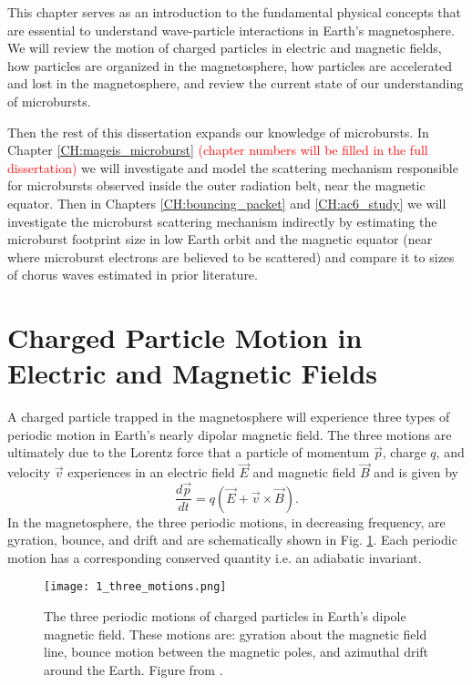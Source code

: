 This chapter serves as an introduction to the fundamental physical concepts that are essential to understand wave-particle interactions in Earth's magnetosphere. We will review the motion of charged particles in electric and magnetic fields, how particles are organized in the magnetosphere, how particles are accelerated and lost in the magnetosphere, and review the current state of our understanding of microbursts.

Then the rest of this dissertation expands our knowledge of microbursts. In Chapter \ref{CH:mageis_microburst} \textcolor{red}{(chapter numbers will be filled in the full dissertation)} we will investigate and model the scattering mechanism responsible for microbursts observed inside the outer radiation belt, near the magnetic equator. Then in Chapters \ref{CH:bouncing_packet} and \ref{CH:ac6_study} we will investigate the microburst scattering mechanism indirectly by estimating the microburst footprint size in low Earth orbit and the magnetic equator (near where microburst electrons are believed to be scattered) and compare it to sizes of chorus waves estimated in prior literature.

\section{Charged Particle Motion in Electric and Magnetic Fields}\label{Intro:particle_motion}
A charged particle trapped in the magnetosphere will experience three types of periodic motion in Earth's nearly dipolar magnetic field. The three motions are ultimately due to the Lorentz force that a particle of momentum $\vec{p}$, charge $q$, and velocity $\vec{v}$ experiences in an electric field $\vec{E}$ and magnetic field $\vec{B}$ and is given by
\begin{equation} \label{Intro:Lorentz}
\frac{d\vec{p}}{dt} = q(\vec{E} + \vec{v} \times \vec{B}).
\end{equation} In the magnetosphere, the three periodic motions, in decreasing frequency, are gyration, bounce, and drift and are schematically shown in Fig. \ref{Intro:motion_diagram}. Each periodic motion has a corresponding conserved quantity i.e. an adiabatic invariant. 

\begin{figure}
\texttt{[image: 1\_three\_motions.png]}
\caption{The three periodic motions of charged particles in Earth's dipole magnetic field. These motions are: gyration about the magnetic field line, bounce motion between the magnetic poles, and azimuthal drift around the Earth. Figure from \citep{Baumjohann1997}.}
\label{Intro:motion_diagram}
\end{figure}


